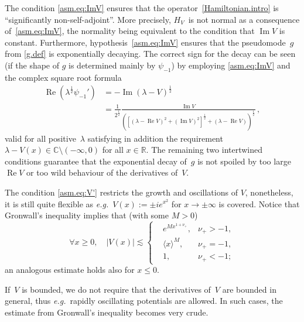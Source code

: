 The condition \eqref{asm.eq:ImV} ensures that the operator~\eqref{Hamiltonian.intro} is ``significantly non-self-adjoint''.
More precisely, $H_V$~is not normal as a consequence of~\eqref{asm.eq:ImV},
the normality being equivalent to the condition that ${\operatorname{Im}} V$ is constant. 
Furthermore, hypothesis~\eqref{asm.eq:ImV} ensures that
the pseudomode~$g$ from \eqref{g.def} is exponentially decaying. The correct sign for the decay can be seen (if  the shape of $g$ is determined mainly by $\psi_{-1}$) by employing \eqref{asm.eq:ImV} and the complex square root formula
\begin{equation}\label{sqr.rt}
\begin{aligned}
{\operatorname{Re}} \left( \lambda^{\frac 12} \psi_{-1}' \right)
&= 
- {\operatorname{Im}}(\lambda-V)^\frac{1}{2} 
\\ &=
\frac{1}{ 2^\frac12} \frac{{\operatorname{Im}} V}
	{\left(\left[(\lambda-{\operatorname{Re}} V)^2+({\operatorname{Im}} V)^2\right]^\frac12+(\lambda-{\operatorname{Re}} V)\right)^\frac 12} \,, 
\end{aligned}
\end{equation}
valid for all positive~$\lambda$ satisfying in addition  
the requirement $\lambda -V(x) \in {\mathbb{C}}\setminus(-\infty,0)$
for all $x \in {\mathbb{R}}$.
The remaining two intertwined conditions guarantee 
that the exponential decay of~$g$ is not spoiled by too large ${\operatorname{Re}} V$ 
or too wild behaviour of the derivatives of~$V$. 

The condition \eqref{asm.eq:V'} restricts the growth and oscillations of $V$, nonetheless, it is still quite flexible as 
{\emph{e.g.}}~$V(x) := \pm i e^{x^2}$ for $x \to \pm \infty$ is covered. 
Notice that Gronwall's inequality implies that (with some $M>0$)
\begin{equation}\label{Gronw.est}
\forall x \geq 0, \quad |V(x)| {\lesssim}
\left \{
\begin{aligned}
& e^{M x^{1+\nu_+}},
& \nu_+ > -1,
\\
&\langle x \rangle^M, & \nu_+  =-1,
\\
& 1, & \nu_+ < -1;
\end{aligned} 
\right.
\end{equation} 
an analogous estimate holds also for $x \leq 0$. 

If~$V$ is bounded, we do not require that the derivatives of~$V$ are bounded
in general, thus {\emph{e.g.}}~rapidly oscillating potentials are allowed. 
In such cases, the estimate from Gronwall's inequality becomes very crude. 

